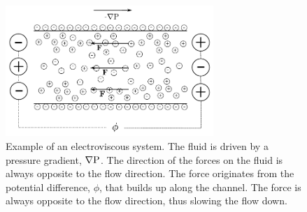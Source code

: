 \begin{figure}
\begin{center}
\includegraphics[width=0.7\textwidth]{fig/channel_electroviscous.pdf}
\end{center}
\caption{Example of an electroviscous system. The fluid is driven by a
  pressure gradient, $\nabla \mathrm{P}$. The direction of the forces on the
  fluid is always opposite to the flow direction. The force originates
  from the potential difference, $\phi$, that builds up along the
  channel. The force is always opposite to the flow direction, thus
  slowing the flow down.}
\label{fig:et:ev}
\end{figure}
